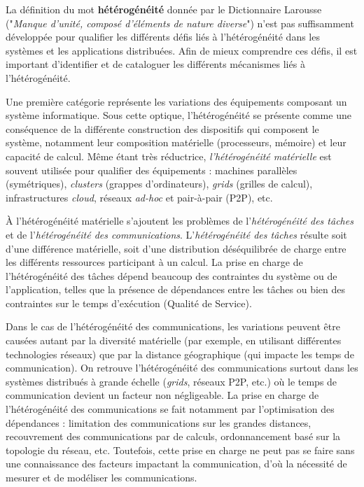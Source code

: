 
La définition du mot \textbf{hétérogénéité} donnée par le Dictionnaire Larousse ("\textit{Manque d'unité, composé d'éléments de nature diverse}") n'est pas suffisamment développée pour qualifier les différents défis liés à l'hétérogénéité dans les systèmes et les applications distribuées. Afin de mieux comprendre ces défis, il est important d'identifier et de cataloguer les différents mécanismes liés à l'hétérogénéité.

Une première catégorie représente les variations des équipements composant un système informatique. Sous cette optique, l'hétérogénéité se présente comme une conséquence de la différente construction des dispositifs qui composent le système, notamment leur composition matérielle (processeurs, mémoire) et leur capacité de calcul.   Même étant très réductrice, \textit{l'hétérogénéité matérielle} est souvent utilisée pour qualifier des équipements : machines parallèles (symétriques), \textit{clusters} (grappes d'ordinateurs), \textit{grids} (grilles de calcul), infrastructures \textit{cloud}, réseaux \textit{ad-hoc} et pair-à-pair (P2P), etc.

À l'hétérogénéité matérielle s'ajoutent les problèmes de l'\textit{hétérogénéité des tâches} et de l'\textit{hétérogénéité des communications}. L'\textit{hétérogénéité des tâches} résulte soit d'une différence matérielle, soit d'une distribution déséquilibrée de charge entre les différents ressources participant à un calcul. La prise en charge de l'hétérogénéité des tâches dépend beaucoup des contraintes du système ou de l'application, telles que la présence de dépendances entre les tâches ou bien des contraintes sur le temps d'exécution (Qualité de Service).

Dans le cas de l'hétérogénéité des communications, les variations peuvent être causées autant par la diversité matérielle (par exemple, en utilisant différentes technologies réseaux) que par la distance géographique (qui impacte les temps de communication). On retrouve l'hétérogénéité des communications surtout dans les systèmes distribués à grande échelle (\textit{grids}, réseaux P2P, etc.) où le temps de communication devient un facteur non négligeable. La prise en charge de l'hétérogénéité des communications se fait notamment par l'optimisation des dépendances : limitation des communications sur les grandes distances,  recouvrement des communications par de calculs, ordonnancement basé sur la topologie du réseau, etc. Toutefois, cette prise en charge ne peut pas se faire sans une connaissance des facteurs impactant la communication, d'où la nécessité de mesurer et de modéliser les communications. 

